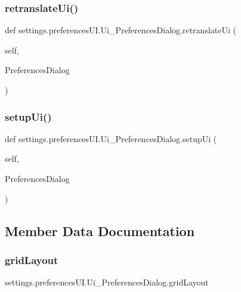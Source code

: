\subsubsection{\texorpdfstring{retranslate\+Ui()}{retranslateUi()}}
{\footnotesize\ttfamily def settings.\+preferences\+U\+I.\+Ui\+\_\+\+Preferences\+Dialog.\+retranslate\+Ui (\begin{DoxyParamCaption}\item[{}]{self,  }\item[{}]{Preferences\+Dialog }\end{DoxyParamCaption})}

\hypertarget{classsettings_1_1preferences_u_i_1_1_ui___preferences_dialog_a61eadae581e6b31932e65f89ee78760c}{}\label{classsettings_1_1preferences_u_i_1_1_ui___preferences_dialog_a61eadae581e6b31932e65f89ee78760c} 
\subsubsection{\texorpdfstring{setup\+Ui()}{setupUi()}}
{\footnotesize\ttfamily def settings.\+preferences\+U\+I.\+Ui\+\_\+\+Preferences\+Dialog.\+setup\+Ui (\begin{DoxyParamCaption}\item[{}]{self,  }\item[{}]{Preferences\+Dialog }\end{DoxyParamCaption})}



\subsection{Member Data Documentation}
\hypertarget{classsettings_1_1preferences_u_i_1_1_ui___preferences_dialog_a9758be9a7207723c709109813da770fb}{}\label{classsettings_1_1preferences_u_i_1_1_ui___preferences_dialog_a9758be9a7207723c709109813da770fb} 
\subsubsection{\texorpdfstring{grid\+Layout}{gridLayout}}
{\footnotesize\ttfamily settings.\+preferences\+U\+I.\+Ui\+\_\+\+Preferences\+Dialog.\+grid\+Layout}

